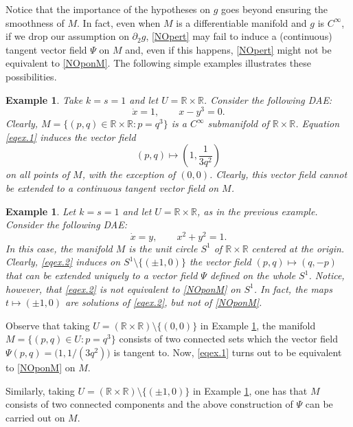\documentclass[a4paper]{amsart}
\numberwithin{equation}{section}
\newtheorem{example}[theorem]{Example}
\newcommand{\R}{\mathbb{R}}
\begin{document}
Notice that the importance of the hypotheses on $g$ goes beyond ensuring the smoothness
of $M$. In fact, even when $M$ is a differentiable manifold and $g$ is $C^\infty$, if we 
drop our assumption on $\partial_2g$, \eqref{NOpert} may fail to induce a (continuous)
tangent vector field $\Psi$ on $M$ and, even if this happens, \eqref{NOpert}  might not be
equivalent to \eqref{NOponM}. The following simple examples illustrates these possibilities.
\begin{example}\label{EX.1}
Take $k=s=1$ and let $U=\R\times\R$. Consider the following DAE: 
\begin{equation}\label{eqex.1}
 \dot x=1,\qquad x-y^3=0.
\end{equation}
Clearly, $M=\{(p,q)\in\R\times\R:p=q^3\}$ is a $C^\infty$ submanifold of $\R\times\R$. 
Equation \eqref{eqex.1} induces the vector field 
\[
(p,q)\mapsto\left(1,\frac{1}{3q^2}\right)
\]
on all points of $M$, with the exception of $(0,0)$. Clearly, this vector field cannot
be extended to a continuous tangent vector field on $M$.
\end{example}
\begin{example}\label{EX.2}
Let $k=s=1$ and let $U=\R\times\R$, as in the previous example. Consider the following DAE:
\begin{equation}\label{eqex.2}
 \dot x=y,\qquad x^2+y^2=1.
\end{equation}
In this case, the manifold $M$ is the unit circle $S^1$ of $\R\times\R$ centered at the 
origin. Clearly, \eqref{eqex.2} induces on $S^1\setminus\{(\pm 1,0)\}$ the vector field 
$(p,q)\mapsto (q,-p)$ that can be extended uniquely to a vector field $\Psi$ defined on the 
whole $S^1$. Notice, however, that \eqref{eqex.2} is not equivalent to \eqref{NOponM} on 
$S^1$. In fact, the maps $t\mapsto(\pm 1,0)$ are solutions of \eqref{eqex.2}, but not of 
\eqref{NOponM}.
\end{example}

Observe that taking $U=(\R\times\R)\setminus\{(0,0)\}$ in Example \ref{EX.1}, the manifold 
$M=\{(p,q)\in U:p=q^3\}$ consists of two connected sets which the vector field 
$\Psi(p,q)=\big(1,1/(3q^2)\big)$ is tangent to. Now, \eqref{eqex.1} turns out 
to be equivalent to \eqref{NOponM} on $M$. 

Similarly, taking $U=(\R\times\R)\setminus\{(\pm 1,0)\}$ in Example \ref{EX.2}, one has that 
$M$ consists of two connected components and the above construction of $\Psi$ can be carried 
out on $M$.
\end{document}
